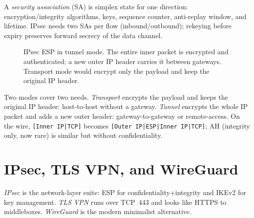\begin{definition}\label{def:sa}
A \emph{security association} (SA) is simplex state for one direction:
encryption/integrity algorithms, keys, sequence counter, anti-replay window,
and lifetime. IPsec needs two SAs per flow (inbound/outbound); rekeying
before expiry preserves forward secrecy of the data channel.
\end{definition}

\begin{figure}[h]\centering
{}
\caption{IPsec ESP in tunnel mode. The entire inner packet is encrypted and authenticated; a new outer IP header carries it between gateways. Transport mode would encrypt only the payload and keep the original IP header.}
\label{fig:ipsec-encap}
\end{figure}

Two modes cover two needs. \emph{Transport} encrypts the payload and keeps the
original IP header: host-to-host without a gateway. \emph{Tunnel} encrypts the
whole IP packet and adds a new outer header: gateway-to-gateway or
remote-access. On the wire, \texttt{[Inner IP|TCP]} becomes \texttt{[Outer
IP|ESP|Inner IP|TCP]}; AH (integrity only, now rare) is similar but without
confidentiality.

\section{IPsec, TLS VPN, and WireGuard}\label{sec:protocols}
\emph{IPsec} is the network-layer suite: ESP for confidentiality+integrity and
IKEv2 for key management. \emph{TLS VPN} runs over TCP~443 and looks like
HTTPS to middleboxes. \emph{WireGuard} is the modern minimalist alternative.


